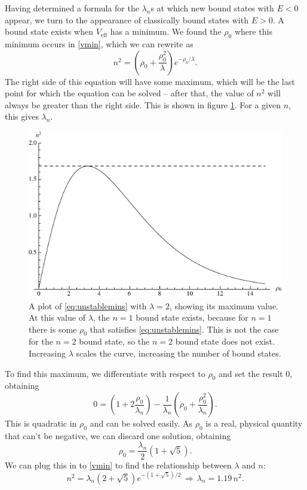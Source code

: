 \documentclass[12pt,twoside]{reedthesis}
\begin{document}
Having determined a formula for the $\lambda_n$s at which new bound states with $E < 0$ appear, we turn to the appearance of classically bound states with $E > 0$. A bound state exists when $V_{\mathrm{eff}}$ has a minimum. We found the $\rho_0$ where this minimum occurs in \eqref {vmin}, which we can rewrite as
\begin{equation}
n^2 = \left( \rho_0 + \frac{\rho_0^2}{\lambda} \right) e^{-\rho_0/\lambda}\mbox{.}
\label{eq:unstablemins}
\end{equation}
The right side of this equation will have some maximum, which will be the last point for which the equation can be solved -- after that, the value of $n^2$ will always be greater than the right side. This is shown in figure \ref{fig:unstableveff}. For a given $n$, this gives $\lambda_n$.
\begin{figure}[h]
	\centering
	\includegraphics{Figures/unstableveff}
	\caption[$n^2$ as a function of $\rho_0$]{A plot of \eqref{eq:unstablemins} with $\lambda = 2$, showing its maximum value. At this value of $\lambda$, the $n = 1$ bound state exists, because for $n = 1$ there is some $\rho_0$ that satisfies \eqref{eq:unstablemins}. This is not the case for the $n = 2$ bound state, so the $n = 2$ bound state does not exist. Increasing $\lambda$ scales the curve, increasing the number of bound states.}
	\label{fig:unstableveff}
\end{figure}
To find this maximum, we differentiate with respect to $\rho_0$ and set the result 0, obtaining
\begin{equation}
0 = (1+2 \frac{\rho_0}{\lambda_n}) - \frac{1}{\lambda_n}(\rho_0 + \frac{\rho_0^2}{\lambda_n})\mbox{.} 
\end{equation}
This is quadratic in $\rho_0$ and can be solved easily.
As $\rho_0$ is a real, physical quantity that can't be negative, we can discard one solution, obtaining
\begin{equation}
\rho_0 = \frac{\lambda_n}{2}(1+\sqrt{5})\mbox{.}
\end{equation}
We can plug this in to \eqref{vmin} to find the relationship between $\lambda$ and $n$:
\begin{equation}
n^2 = \lambda_{n}(2 + \sqrt{5})e^{-(1+ \sqrt{5})/2}\, \Rightarrow \, \lambda_n =  1.19\, n^2\mbox{.}
\label{eq:unstable}
\end{equation}
\end{document}
